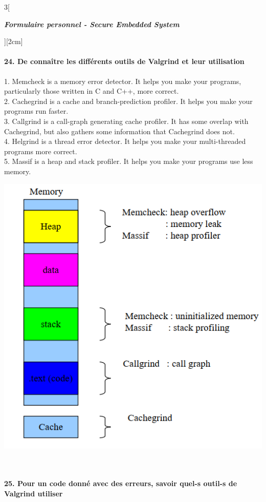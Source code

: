 \begin{multicols}{3}[\centerline{ \large\em \textbf{Formulaire personnel - Secure Embedded System}}][2cm]
\paragraph*{24. De connaître les différents outils de Valgrind et leur utilisation\\}
1. Memcheck is a memory error detector. It helps you make your programs, particularly those written in C and C++, more correct.\\
2. Cachegrind is a cache and branch-prediction profiler. It helps you make your programs run faster.\\
3. Callgrind is a call-graph generating cache profiler. It has some overlap with Cachegrind, but also gathers some information that Cachegrind does not.\\
4. Helgrind is a thread error detector. It helps you make your multi-threaded programs more correct.\\
5. Massif is a heap and stack profiler. It helps you make your programs use less memory.\\
\begin{minipage}{\linewidth}
	\centering
    \includegraphics[width =0.8\columnwidth]{images/10.png}
\end{minipage}\\
\paragraph*{25. Pour un code donné avec des erreurs, savoir quel-s outil-s de Valgrind utiliser\\}
\begin{minipage}{\linewidth}
	\centering
\end{minipage}\\


\end{multicols}
